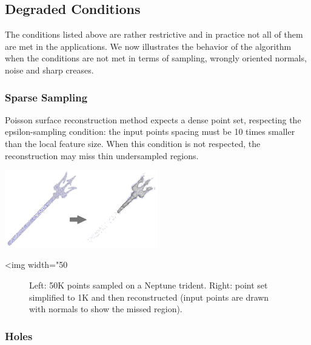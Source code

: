 \subsection{Degraded Conditions}

The conditions listed above are rather restrictive and in practice not all of them are met in the applications. We now illustrates the behavior of the algorithm when the conditions are not met in terms of sampling, wrongly oriented normals, noise and sharp creases.

\subsubsection{Sparse Sampling}

Poisson surface reconstruction method expects a dense point set, respecting the epsilon-sampling condition:
the input points spacing must be 10 times smaller than the local feature size. When this condition is not respected, the reconstruction may miss thin undersampled regions.

\begin{center}
    \label{Surface_reconstruction_points_3-fig-sampling}
    \begin{ccTexOnly}
      \includegraphics[width=0.5\textwidth]{Surface_reconstruction_points_3/sampling} %
    \end{ccTexOnly}
    \begin{ccHtmlOnly}
        <img width="50%
    \end{ccHtmlOnly}
    \begin{figure}[h]
        \caption{Left: 50K points sampled on a Neptune trident.
                 Right: point set simplified to 1K and then reconstructed
                 (input points are drawn with normals to show the missed region).}
    \end{figure}
\end{center}


\subsubsection{Holes}

